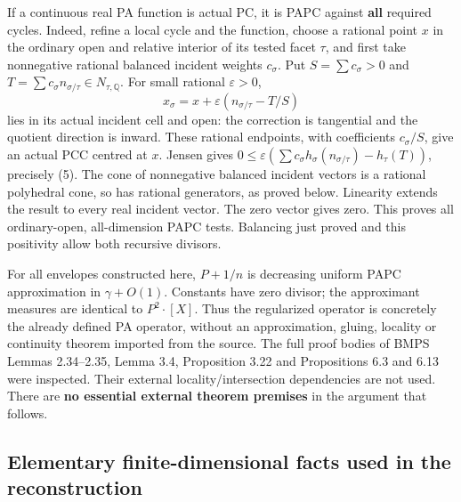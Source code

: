 \documentclass[
  11pt,
]{article}
\begin{document}
If a continuous real PA function is actual PC, it is PAPC against
\textbf{all} required cycles. Indeed, refine a local cycle and the
function, choose a rational point \(x\) in the ordinary open and
relative interior of its tested facet \(\tau\), and first take
nonnegative rational balanced incident weights \(c_\sigma\). Put
\(S=\sum c_\sigma>0\) and
\(T=\sum c_\sigma n_{\sigma/\tau}\in N_{\tau,\mathbb Q}\). For small
rational \(\varepsilon>0\), \[
 x_\sigma=x+\varepsilon(n_{\sigma/\tau}-T/S)
\] lies in its actual incident cell and open: the correction is
tangential and the quotient direction is inward. These rational
endpoints, with coefficients \(c_\sigma/S\), give an actual PCC centred
at \(x\). Jensen gives
\(0\leq\varepsilon(\sum c_\sigma h_\sigma(n_{\sigma/\tau})-h_\tau(T))\),
precisely (5). The cone of nonnegative balanced incident vectors is a
rational polyhedral cone, so has rational generators, as proved below.
Linearity extends the result to every real incident vector. The zero
vector gives zero. This proves all ordinary-open, all-dimension PAPC
tests. Balancing just proved and this positivity allow both recursive
divisors.

For all envelopes constructed here, \(P+1/n\) is decreasing uniform PAPC
approximation in \(\gamma+O(1)\). Constants have zero divisor; the
approximant measures are identical to \(P^2\cdot[X]\). Thus the
regularized operator is concretely the already defined PA operator,
without an approximation, gluing, locality or continuity theorem
imported from the source. The full proof bodies of BMPS Lemmas
2.34--2.35, Lemma 3.4, Proposition 3.22 and Propositions 6.3 and 6.13
were inspected. Their external locality/intersection dependencies are
not used. There are \textbf{no essential external theorem premises} in
the argument that follows.

\subsection{Elementary finite-dimensional facts used in the
reconstruction}\label{elementary-finite-dimensional-facts-used-in-the-reconstruction}
\end{document}

